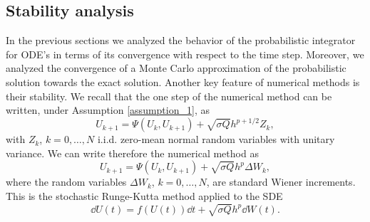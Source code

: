 \subsection{Stability analysis}

In the previous sections we analyzed the behavior of the probabilistic integrator for ODE's in terms of its convergence with respect to the time step. Moreover, we analyzed the convergence of a Monte Carlo approximation of the probabilistic solution towards the exact solution. Another key feature of numerical methods is their stability. We recall that the one step of the numerical method can be written, under Assumption \ref{assumption_1}, as
\begin{equation}
	U_{k+1} = \Psi(U_{k}, U_{k+1}) + \sqrt{\sigma Q}h^{p+1/2}Z_k,
\end{equation}
with $Z_k$, $k = 0, \ldots, N$ i.i.d. zero-mean normal random variables with unitary variance. We can write therefore the numerical method as
\begin{equation}
	U_{k+1} = \Psi(U_{k}, U_{k+1}) + \sqrt{\sigma Q}h^{p}\Delta W_k,
\end{equation}
where the random variables $\Delta W_k$, $k = 0, \ldots, N$, are standard Wiener increments. This is the stochastic Runge-Kutta method applied to the SDE
\begin{equation}
	\dd U(t) = f(U(t))\dd t + \sqrt{\sigma Q}h^p \dd W(t).
\end{equation}
